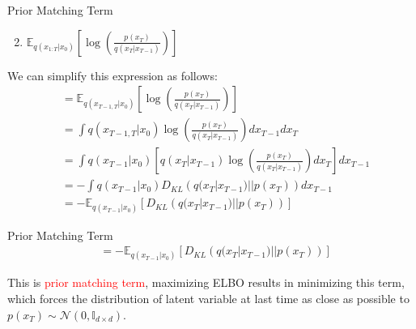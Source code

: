 \begin{frame}{Prior Matching Term}
    \begin{enumerate}
        \setcounter{enumi}{1}   
        \item $\mathbb{E}_{q(x_{1:T}|x_0)} \left[ \log \left( \frac{p(x_T)}{q(x_T|x_{T-1})} \right) \right]$
    \end{enumerate}
    We can simplify this expression as follows:
    \begin{align*}
        &= \mathbb{E}_{q(x_{T-1,T}|x_{0})} \left[ \log \left( \frac{p(x_T)}{q(x_T|x_{T-1})} \right) \right] \\
        &= \int q(x_{T-1,T}|x_{0}) \log \left( \frac{p(x_T)}{q(x_T|x_{T-1})} \right) dx_{T-1} dx_T \\
        &= \int q(x_{T-1}|x_{0}) \left[ q(x_T|x_{T-1}) \log \left( \frac{p(x_T)}{q(x_T|x_{T-1})} \right) dx_T \right] dx_{T-1} \\
        &= -\int q(x_{T-1}|x_{0}) D_{KL} \left( q(x_T|x_{T-1}) || p(x_T) \right) dx_{T-1} \\
        &= -\mathbb{E}_{q(x_{T-1}|x_{0})} \left[ D_{KL} \left( q(x_T|x_{T-1}) || p(x_T) \right) \right] 
    \end{align*} 
\end{frame}

\begin{frame}{Prior Matching Term}
    \begin{align*}
        &= -\mathbb{E}_{q(x_{T-1}|x_{0})} \left[ D_{KL} \left( q(x_T|x_{T-1}) || p(x_T) \right) \right] 
    \end{align*} 

    This is \textcolor{red}{prior matching term}, maximizing ELBO results in minimizing this term, which forces the distribution of latent variable at last time as close as possible to $p(x_T) \sim \mathcal{N}(0, \mathbb{I}_{d \times d})$.
\end{frame}

